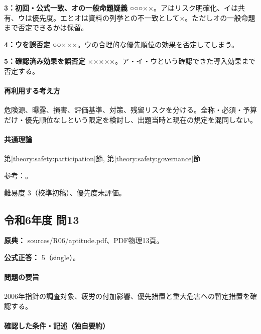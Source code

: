 \noindent\textbf{3：初回・公式一致、オの一般命題疑義} ○○○××。アはリスク明確化、イは共有、ウは優先度。エとオは資料の列挙との不一致として×。ただしオの一般命題まで否定できるかは保留。\par

\noindent\textbf{4：ウを誤否定} ○○×××。ウの合理的な優先順位の効果を否定してしまう。\par

\noindent\textbf{5：確認済み効果を誤否定} ×××××。ア・イ・ウという確認できた導入効果まで否定する。\par

\paragraph{再利用する考え方} 危険源、曝露、損害、評価基準、対策、残留リスクを分ける。全称・必須・予算だけ・優先順位なしという限定を検討し、出題当時と現在の規定を混同しない。

\paragraph{共通理論} \hyperref[theory:safety:participation]{第\ref*{theory:safety:participation}節}, \hyperref[theory:safety:governance]{第\ref*{theory:safety:governance}節}

\par 参考：\cite{saf_ra_effects,saf_ra2006,saf_chem2016}。

\par 難易度 3（校準初稿）、優先度未評価。

\subsection{令和6年度 問13}
\label{q:r06-reg-apt-13}

\noindent\textbf{原典：} sources/R06/aptitude.pdf、PDF物理13頁。

\textbf{公式正答：} 5（single）。

\paragraph{問題の要旨} 2006年指針の調査対象、疲労の付加影響、優先措置と重大危害への暫定措置を確認する。

\paragraph{確認した条件・記述（独自要約）}\mbox{}\par

